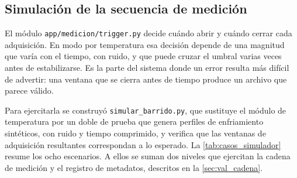 \subsection{Simulación de la secuencia de medición}
\label{sec:val_simulador}

El módulo \texttt{app/medicion/trigger.py} decide cuándo abrir y cuándo
cerrar cada adquisición. En modo por temperatura esa decisión depende de
una magnitud que varía con el tiempo, con ruido, y que puede cruzar el
umbral varias veces antes de estabilizarse. Es la parte del sistema
donde un error resulta más difícil de advertir: una ventana que se
cierra antes de tiempo produce un archivo que parece válido.

Para ejercitarla se construyó \texttt{simular\_barrido.py}, que sustituye
el módulo de temperatura por un doble de prueba que genera perfiles de
enfriamiento sintéticos, con ruido y tiempo comprimido, y verifica que
las ventanas de adquisición resultantes correspondan a lo esperado. La
\cref{tab:casos_simulador} resume los ocho escenarios. A ellos se suman
dos niveles que ejercitan la cadena de medición y el registro de
metadatos, descritos en la \cref{sec:val_cadena}.

